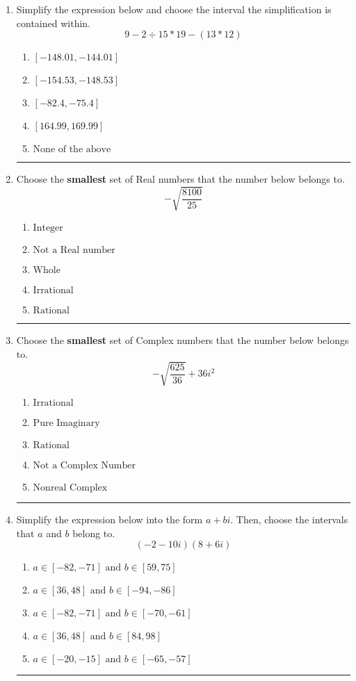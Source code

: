 \documentclass[14pt]{extbook}
\newcommand{\litem}[1]{\item#1\hspace*{-1cm}\rule{\textwidth}{0.4pt}}
\begin{document}
\begin{enumerate}
{\begin{enumerate}[label=\Alph*.]
\end{enumerate} }
\litem{
Simplify the expression below and choose the interval the simplification is contained within.\[ 9 - 2 \div 15 * 19 - (13 * 12) \]\begin{enumerate}[label=\Alph*.]
\item \( [-148.01, -144.01] \)
\item \( [-154.53, -148.53] \)
\item \( [-82.4, -75.4] \)
\item \( [164.99, 169.99] \)
\item \( \text{None of the above} \)

\end{enumerate} }
\litem{
Choose the \textbf{smallest} set of Real numbers that the number below belongs to.\[ -\sqrt{\frac{8100}{25}} \]\begin{enumerate}[label=\Alph*.]
\item \( \text{Integer} \)
\item \( \text{Not a Real number} \)
\item \( \text{Whole} \)
\item \( \text{Irrational} \)
\item \( \text{Rational} \)

\end{enumerate} }
\litem{
Choose the \textbf{smallest} set of Complex numbers that the number below belongs to.\[ -\sqrt{\frac{625}{36}} + 36i^2 \]\begin{enumerate}[label=\Alph*.]
\item \( \text{Irrational} \)
\item \( \text{Pure Imaginary} \)
\item \( \text{Rational} \)
\item \( \text{Not a Complex Number} \)
\item \( \text{Nonreal Complex} \)

\end{enumerate} }
\litem{
Simplify the expression below into the form $a+bi$. Then, choose the intervals that $a$ and $b$ belong to.\[ (-2 - 10 i)(8 + 6 i) \]\begin{enumerate}[label=\Alph*.]
\item \( a \in [-82, -71] \text{ and } b \in [59, 75] \)
\item \( a \in [36, 48] \text{ and } b \in [-94, -86] \)
\item \( a \in [-82, -71] \text{ and } b \in [-70, -61] \)
\item \( a \in [36, 48] \text{ and } b \in [84, 98] \)
\item \( a \in [-20, -15] \text{ and } b \in [-65, -57] \)


\end{enumerate}}
\end{enumerate}
\end{document}
